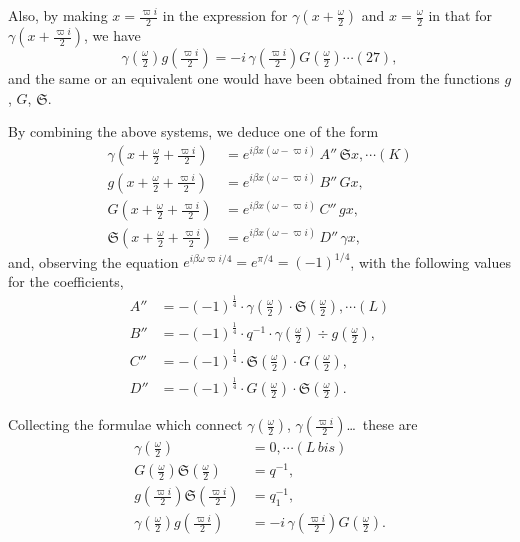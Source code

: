 \documentclass[12pt,a4paper]{article}
\newcommand{\fS}{\mathfrak{S}}
\begin{document}
\newpage
\setcounter{page}{143}

Also, by making $x = \tfrac{\varpi i}{2}$ in the expression for $\gamma\!\left(x + \tfrac{\omega}{2}\right)$ and $x = \tfrac{\omega}{2}$ in that for $\gamma\!\left(x + \tfrac{\varpi i}{2}\right)$, we have
\[
\gamma\!\left(\tfrac{\omega}{2}\right)g\!\left(\tfrac{\varpi i}{2}\right) = -i\,\gamma\!\left(\tfrac{\varpi i}{2}\right)G\!\left(\tfrac{\omega}{2}\right) \cdots(27),
\]
and the same or an equivalent one would have been obtained from the functions $g$, $G$, $\fS$.

By combining the above systems, we deduce one of the form
\begin{align*}
\gamma\!\left(x + \tfrac{\omega}{2} + \tfrac{\varpi i}{2}\right) &= e^{i\beta x(\omega - \varpi i)}\,A''\,\fS x, \cdots(K)\\
g\!\left(x + \tfrac{\omega}{2} + \tfrac{\varpi i}{2}\right) &= e^{i\beta x(\omega - \varpi i)}\,B''\,G x,\\
G\!\left(x + \tfrac{\omega}{2} + \tfrac{\varpi i}{2}\right) &= e^{i\beta x(\omega - \varpi i)}\,C''\,g x,\\
\fS\!\left(x + \tfrac{\omega}{2} + \tfrac{\varpi i}{2}\right) &= e^{i\beta x(\omega - \varpi i)}\,D''\,\gamma x,
\end{align*}
and, observing the equation $e^{i\beta\omega\varpi i/4} = e^{\pi/4} = (-1)^{1/4}$, with the following values for the coefficients,
\begin{align*}
A'' &= -(-1)^{\frac{1}{4}}\cdot\gamma\!\left(\tfrac{\omega}{2}\right)\cdot\fS\!\left(\tfrac{\omega}{2}\right), \cdots(L)\\
B'' &= -(-1)^{\frac{1}{4}}\cdot q^{-1}\cdot\gamma\!\left(\tfrac{\omega}{2}\right)\div g\!\left(\tfrac{\omega}{2}\right),\\
C'' &= -(-1)^{\frac{1}{4}}\cdot\fS\!\left(\tfrac{\omega}{2}\right)\cdot G\!\left(\tfrac{\omega}{2}\right),\\
D'' &= -(-1)^{\frac{1}{4}}\cdot G\!\left(\tfrac{\omega}{2}\right)\cdot\fS\!\left(\tfrac{\omega}{2}\right).
\end{align*}

Collecting the formulae which connect $\gamma\!\left(\tfrac{\omega}{2}\right)$, $\gamma\!\left(\tfrac{\varpi i}{2}\right)$\ldots\ these are
\begin{align*}
\gamma\!\left(\tfrac{\omega}{2}\right) &= 0, \cdots(L\,bis)\\
G\!\left(\tfrac{\omega}{2}\right)\fS\!\left(\tfrac{\omega}{2}\right) &= q^{-1},\\
g\!\left(\tfrac{\varpi i}{2}\right)\fS\!\left(\tfrac{\varpi i}{2}\right) &= q_1^{-1},\\
\gamma\!\left(\tfrac{\omega}{2}\right)g\!\left(\tfrac{\varpi i}{2}\right) &= -i\,\gamma\!\left(\tfrac{\varpi i}{2}\right)G\!\left(\tfrac{\omega}{2}\right).
\end{align*}
\end{document}
